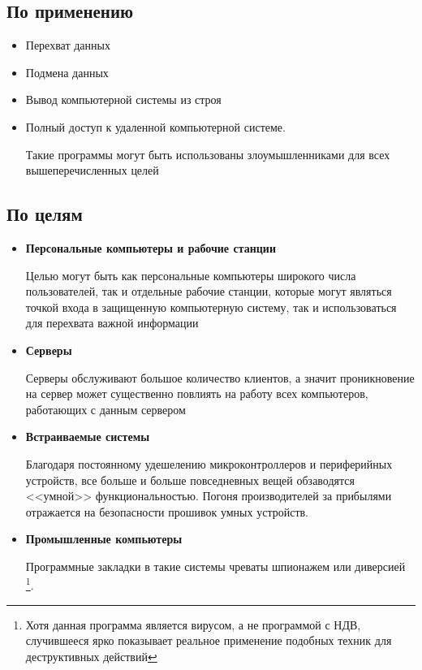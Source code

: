     \subsection{По применению}\label{sec:ch1/sec2/sub1}
    \begin{itemize}
        \item Перехват данных
        \item Подмена данных
        \item Вывод компьютерной системы из строя
        \item Полный доступ к удаленной компьютерной системе.

              Такие программы могут быть использованы злоумышленниками для
              всех вышеперечисленных целей
    \end{itemize}
\subsection{По целям}\label{sec:ch1/sec2/sub2}
\begin{itemize}
    \item \textbf{Персональные компьютеры и рабочие станции}
          
          Целью могут быть как персональные компьютеры широкого числа пользователей,
          так и отдельные рабочие станции, которые могут являться точкой входа в
          защищенную компьютерную систему, так и использоваться для перехвата важной
          информации
    \item \textbf{Серверы}
          
          Серверы обслуживают большое количество клиентов, а значит проникновение на
          сервер может существенно повлиять на работу всех компьютеров, работающих с
          данным сервером
    \item \textbf{Встраиваемые системы}

          Благодаря постоянному удешелению микроконтроллеров и периферийных устройств,
          все больше и больше повседневных вещей обзаводятся <<умной>> функциональностью.
          Погоня производителей за прибылями отражается на безопасности прошивок умных устройств.
    \item \textbf{Промышленные компьютеры}

        Программные закладки в такие системы чреваты шпионажем или диверсией\autocite{stuxnet}
        \footnote{Хотя данная программа является вирусом, а не программой с НДВ, случившееся
        ярко показывает реальное применение подобных техник для деструктивных действий}.
\end{itemize}

